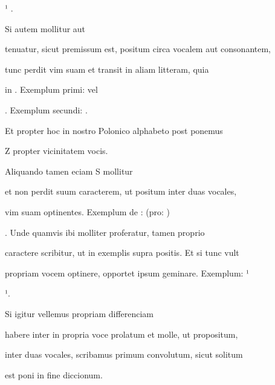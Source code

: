 ¹   .

\indentK Si autem mollitur aut

\fulllines
tenuatur, sicut premissum est, positum circa vocalem aut consonantem,

tunc perdit vim suam et transit in aliam litteram, quia

in . Exemplum primi:  vel  

 . Exemplum secundi:   .

Et propter hoc in nostro Polonico alphabeto post  ponemus

\splitlines

Z propter vicinitatem vocis.

\indentK Aliquando tamen eciam S mollitur

\fulllines

et non perdit suum caracterem, ut positum inter duas vocales,

vim suam optinentes. Exemplum de :   (pro: ) 

. Unde quamvis ibi molliter proferatur, tamen proprio

caractere scribitur, ut in exemplis supra positis. Et si tunc vult

propriam vocem optinere, opportet ipsum geminare. Exemplum: ¹

\newpage
\splitlines

 ¹.

\indentK Si igitur vellemus propriam differenciam

\fulllines

habere inter  in propria voce prolatum et  molle, ut propositum,





\fullpreviouslines

{
\color{blue}

inter duas vocales, scribamus primum convolutum, sicut solitum

est poni in fine diccionum.

}


